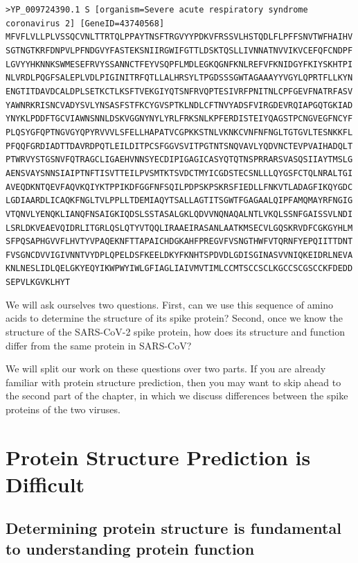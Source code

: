 \texttt{>YP_009724390.1 S [organism=Severe acute respiratory syndrome coronavirus 2] [GeneID=43740568] \\
	MFVFLVLLPLVSSQCVNLTTRTQLPPAYTNSFTRGVYYPDKVFRSSVLHSTQDLFLPFFSNVTWFHAIHV
	SGTNGTKRFDNPVLPFNDGVYFASTEKSNIIRGWIFGTTLDSKTQSLLIVNNATNVVIKVCEFQFCNDPF
	LGVYYHKNNKSWMESEFRVYSSANNCTFEYVSQPFLMDLEGKQGNFKNLREFVFKNIDGYFKIYSKHTPI
	NLVRDLPQGFSALEPLVDLPIGINITRFQTLLALHRSYLTPGDSSSGWTAGAAAYYVGYLQPRTFLLKYN
	ENGTITDAVDCALDPLSETKCTLKSFTVEKGIYQTSNFRVQPTESIVRFPNITNLCPFGEVFNATRFASV
	YAWNRKRISNCVADYSVLYNSASFSTFKCYGVSPTKLNDLCFTNVYADSFVIRGDEVRQIAPGQTGKIAD
	YNYKLPDDFTGCVIAWNSNNLDSKVGGNYNYLYRLFRKSNLKPFERDISTEIYQAGSTPCNGVEGFNCYF
	PLQSYGFQPTNGVGYQPYRVVVLSFELLHAPATVCGPKKSTNLVKNKCVNFNFNGLTGTGVLTESNKKFL
	PFQQFGRDIADTTDAVRDPQTLEILDITPCSFGGVSVITPGTNTSNQVAVLYQDVNCTEVPVAIHADQLT
	PTWRVYSTGSNVFQTRAGCLIGAEHVNNSYECDIPIGAGICASYQTQTNSPRRARSVASQSIIAYTMSLG
	AENSVAYSNNSIAIPTNFTISVTTEILPVSMTKTSVDCTMYICGDSTECSNLLLQYGSFCTQLNRALTGI
	AVEQDKNTQEVFAQVKQIYKTPPIKDFGGFNFSQILPDPSKPSKRSFIEDLLFNKVTLADAGFIKQYGDC
	LGDIAARDLICAQKFNGLTVLPPLLTDEMIAQYTSALLAGTITSGWTFGAGAALQIPFAMQMAYRFNGIG
	VTQNVLYENQKLIANQFNSAIGKIQDSLSSTASALGKLQDVVNQNAQALNTLVKQLSSNFGAISSVLNDI
	LSRLDKVEAEVQIDRLITGRLQSLQTYVTQQLIRAAEIRASANLAATKMSECVLGQSKRVDFCGKGYHLM
	SFPQSAPHGVVFLHVTYVPAQEKNFTTAPAICHDGKAHFPREGVFVSNGTHWFVTQRNFYEPQIITTDNT
	FVSGNCDVVIGIVNNTVYDPLQPELDSFKEELDKYFKNHTSPDVDLGDISGINASVVNIQKEIDRLNEVA
	KNLNESLIDLQELGKYEQYIKWPWYIWLGFIAGLIAIVMVTIMLCCMTSCCSCLKGCCSCGSCCKFDEDD
	SEPVLKGVKLHYT}

We will ask ourselves two questions. First, can we use this sequence of amino acids to determine the structure of its spike protein? Second, once we know the structure of the SARS-CoV-2 spike protein, how does its structure and function differ from the same protein in SARS-CoV?

We will split our work on these questions over two parts. If you are already familiar with protein structure prediction, then you may want to skip ahead to the second part of the chapter, in which we discuss differences between the spike proteins of the two viruses.

\FloatBarrier
{}

\section{Protein Structure Prediction is Difficult}
\label{sec:structure_intro}
\subsection{Determining protein structure is fundamental to understanding protein function}

